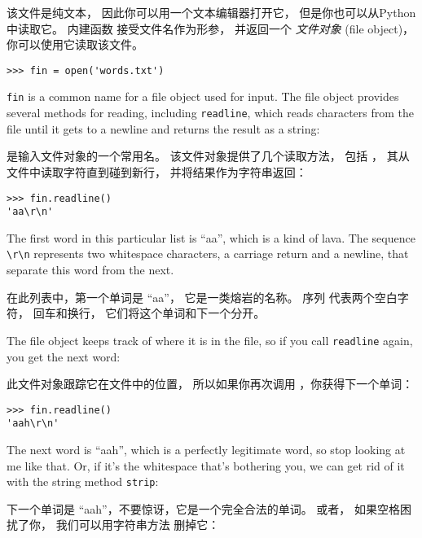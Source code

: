 该文件是纯文本， 因此你可以用一个文本编辑器打开它， 但是你也可以从Python中读取它。 内建函数  接受文件名作为形参， 并返回一个 {\em 文件对象} (file object)， 你可以使用它读取该文件。

  
  
  

\begin{lstlisting}
>>> fin = open('words.txt')
\end{lstlisting}

%
{\tt fin} is a common name for a file object used for input.  The file
object provides several methods for reading, including {\tt readline},
which reads characters from the file until it gets to a newline and
returns the result as a string: 

 是输入文件对象的一个常用名。 该文件对象提供了几个读取方法，
包括 ， 其从文件中读取字符直到碰到新行， 并将结果作为字符串返回：

\begin{lstlisting}
>>> fin.readline()
'aa\r\n'
\end{lstlisting}

%
The first word in this particular list is ``aa'', which is a kind of
lava.  The sequence \verb"\r\n" represents two whitespace characters,
a carriage return and a newline, that separate this word from the
next.

在此列表中，第一个单词是 ``aa''， 它是一类熔岩的名称。 序列 \li{\r\n} 代表两个空白字符， 回车和换行， 它们将这个单词和下一个分开。

The file object keeps track of where it is in the file, so
if you call {\tt readline} again, you get the next word:

此文件对象跟踪它在文件中的位置，
所以如果你再次调用 ，你获得下一个单词：

\begin{lstlisting}
>>> fin.readline()
'aah\r\n'
\end{lstlisting}

%
The next word is ``aah'', which is a perfectly legitimate
word, so stop looking at me like that.
Or, if it's the whitespace that's bothering you,
we can get rid of it with the string method {\tt strip}:

下一个单词是 ``aah''，不要惊讶，它是一个完全合法的单词。
或者， 如果空格困扰了你， 我们可以用字符串方法  删掉它：
  
  


